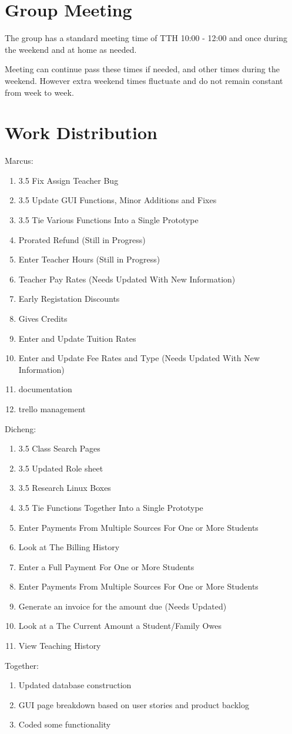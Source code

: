 \documentclass[11pt]{book}
\begin{document}
\section{Group Meeting}

The group has a standard meeting time of TTH 10:00 - 12:00 and once during the weekend and at home as needed.  

Meeting can continue pass these times if needed, and other times during the weekend. However extra weekend times fluctuate and do not remain constant from week to week. 

\section{Work Distribution}

Marcus:
\begin{enumerate}
\item 3.5 Fix Assign Teacher Bug
\item 3.5 Update GUI Functions, Minor Additions and Fixes
\item 3.5 Tie Various Functions Into a Single Prototype
\item Prorated Refund (Still in Progress)
\item Enter Teacher Hours (Still in Progress)
\item Teacher Pay Rates (Needs Updated With New Information)
\item Early Registation Discounts
\item Gives Credits
\item Enter and Update Tuition Rates
\item Enter and Update Fee Rates and Type (Needs Updated With New Information)
\item documentation
\item trello management\\
\end{enumerate}

Dicheng:
\begin{enumerate}
\item 3.5 Class Search Pages
\item 3.5 Updated Role sheet
\item 3.5 Research Linux Boxes
\item 3.5 Tie Functions Together Into a Single Prototype
\item Enter Payments From Multiple Sources For One or More Students
\item Look at The Billing History
\item Enter a Full Payment For One or More Students
\item Enter Payments From Multiple Sources For One or More Students
\item Generate an invoice for the amount due (Needs Updated)
\item Look at a The Current Amount a Student/Family Owes
\item View Teaching History
\end{enumerate}


Together:
\begin{enumerate}
\item Updated database construction
\item GUI page breakdown based on user stories and product backlog
\item Coded some functionality
\end{enumerate}
\end{document}
